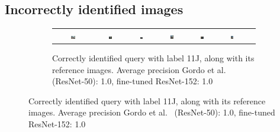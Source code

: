 \subsection{Incorrectly identified images}\label{sec:incorrectimages}
\begin{figure}
\centering
\begin{subfigure}{\textwidth}
\begin{tabular}{|c|*{6}{c}}
\includegraphics[width=0.12\textwidth]{img/11J-0521.JPG} &
\includegraphics[width=0.12\textwidth]{img/11J-0.JPG} &
\includegraphics[width=0.12\textwidth]{img/11J-1.JPG} &
\includegraphics[width=0.12\textwidth]{img/11J-2.JPG} &
\includegraphics[width=0.12\textwidth]{img/11J-3.JPG} &
\includegraphics[width=0.12\textwidth]{img/11J-4.JPG} \\
\end{tabular}
\caption{Correctly identified query with label 11J,
along with its reference images.\newline
Average precision Gordo et al.~\cite{gordo_deep_2016} (ResNet-50): 1.0,
fine-tuned ResNet-152: 1.0
\label{fig:correct11J}}
\end{subfigure}


\end{figure}
